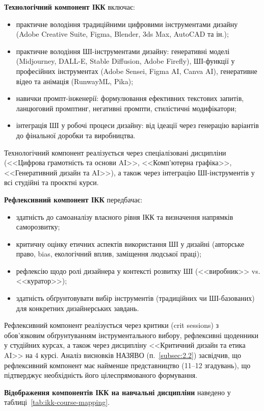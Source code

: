\textbf{Технологічний компонент ІКК} включає:
\begin{itemize}
    \item практичне володіння традиційними цифровими інструментами дизайну (Adobe Creative Suite, Figma, Blender, 3ds Max, AutoCAD та ін.);
    \item практичне володіння ШІ-інструментами дизайну: генеративні моделі (Midjourney, DALL-E, Stable Diffusion, Adobe Firefly), ШІ-функції у професійних інструментах (Adobe Sensei, Figma AI, Canva AI), генеративне відео та анімація (RunwayML, Pika);
    \item навички промпт-інженерії: формулювання ефективних текстових запитів, ланцюговий промптинг, негативні промпти, стилістичні модифікатори;
    \item інтеграція ШІ у робочі процеси дизайну: від ідеації через генерацію варіантів до фінальної доробки та виробництва.
\end{itemize}

Технологічний компонент реалізується через спеціалізовані дисципліни (<<Цифрова грамотність та основи AI>>, <<Комп'ютерна графіка>>, <<Генеративний дизайн та AI>>), а також через інтеграцію ШІ-інструментів у всі студійні та проєктні курси.

\textbf{Рефлексивний компонент ІКК} передбачає:
\begin{itemize}
    \item здатність до самоаналізу власного рівня ІКК та визначення напрямків саморозвитку;
    \item критичну оцінку етичних аспектів використання ШІ у дизайні (авторське право, bias, екологічний вплив, заміщення людської праці);
    \item рефлексію щодо ролі дизайнера у контексті розвитку ШІ (<<виробник>> vs. <<куратор>>);
    \item здатність обґрунтовувати вибір інструментів (традиційних чи ШІ-базованих) для конкретних дизайнерських завдань.
\end{itemize}

Рефлексивний компонент реалізується через критики (crit sessions) з обов'язковим обґрунтуванням інструментального вибору, рефлексивні щоденники у студійних курсах, а також через дисципліну <<Критичний дизайн та етика AI>> на 4 курсі. Аналіз висновків НАЗЯВО (п.~\ref{subsec:2.2}) засвідчив, що рефлексивний компонент має найменше представництво (11--12 згадувань), що підтверджує необхідність його цілеспрямованого формування.

\textbf{Відображення компонентів ІКК на навчальні дисципліни} наведено у таблиці~\ref{tab:ikk-course-mapping}.

